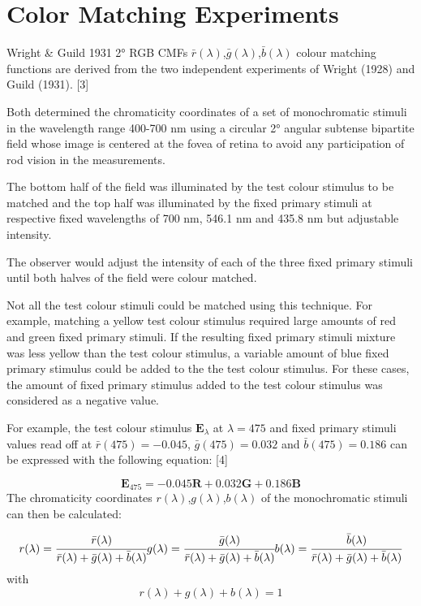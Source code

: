\section{Color Matching Experiments}%
\label{sec:color-matching-experiments}

Wright & Guild 1931 2° RGB CMFs $\bar{r}(\lambda)$,$\bar{g}(\lambda)$,$\bar{b}(\lambda)$ colour matching functions are derived from the two independent experiments of Wright (1928) and Guild (1931). [3]

Both determined the chromaticity coordinates of a set of monochromatic stimuli in the wavelength range 400-700 nm using a circular 2° angular subtense bipartite field whose image is centered at the fovea of retina to avoid any participation of rod vision in the measurements.

The bottom half of the field was illuminated by the test colour stimulus to be matched and the top half was illuminated by the fixed primary stimuli at respective fixed wavelengths of 700 nm, 546.1 nm and 435.8 nm but adjustable intensity.

The observer would adjust the intensity of each of the three fixed primary stimuli until both halves of the field were colour matched.

Not all the test colour stimuli could be matched using this technique. For example, matching a yellow test colour stimulus required large amounts of red and green fixed primary stimuli. If the resulting fixed primary stimuli mixture was less yellow than the test colour stimulus, a variable amount of blue fixed primary stimulus could be added to the the test colour stimulus. For these cases, the amount of fixed primary stimulus added to the test colour stimulus was considered as a negative value.

For example, the test colour stimulus $\textbf{E}_\lambda$ at $\lambda=475$ and fixed primary stimuli values read off at $\bar{r}(475)=-0.045$, $\bar{g}(475)=0.032$ and $\bar{b}(475)=0.186$ can be expressed with the following equation: [4]

$$
\begin{equation}
\textbf{E}_{475}=-0.045\textbf{R}+0.032\textbf{G}+0.186\textbf{B}
\end{equation}
$$
The chromaticity coordinates $r(\lambda)$,$g(\lambda)$,$b(\lambda)$ of the monochromatic stimuli can then be calculated:

$$
\begin{equation}
r(\lambda)=\cfrac{\bar{r}(\lambda)}{\bar{r}(\lambda)+\bar{g}(\lambda)+\bar{b}(\lambda)}\\
g(\lambda)=\cfrac{\bar{g}(\lambda)}{\bar{r}(\lambda)+\bar{g}(\lambda)+\bar{b}(\lambda)}\\
b(\lambda)=\cfrac{\bar{b}(\lambda)}{\bar{r}(\lambda)+\bar{g}(\lambda)+\bar{b}(\lambda)}
\end{equation}
$$
with $$
\begin{equation}
r(\lambda)+g(\lambda)+b(\lambda)=1
\end{equation}
$$